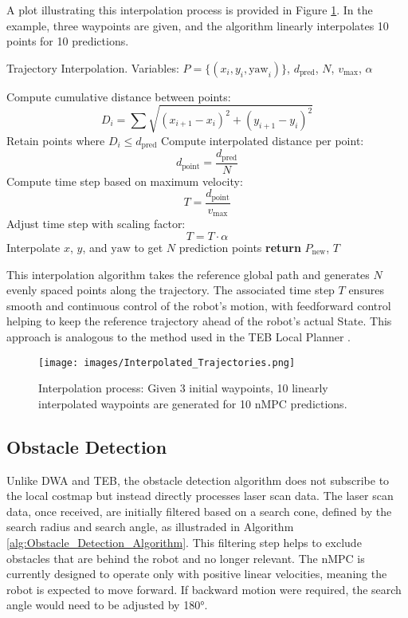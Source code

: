 \documentclass[conference]{IEEEtran}
\begin{document}
A plot illustrating this interpolation process is provided in Figure \ref{fig:nMPC_Interpolation_Plot}. In the example, three waypoints are given, and the algorithm linearly interpolates 10 points for 10 predictions.


\begin{algorithm}
\caption{Trajectory Interpolation. Variables: $P = \{(x_i, y_i, \text{yaw}_i)\}$, $d_{\text{pred}}$, $N$, $v_{\text{max}}$, $\alpha$}
\begin{algorithmic}[1]
\State Compute cumulative distance between points:
\[
D_i = \sum \sqrt{(x_{i+1} - x_i)^2 + (y_{i+1} - y_i)^2}
\]
\State Retain points where $D_i \leq d_{\text{pred}}$
\State Compute interpolated distance per point:
\[
d_{\text{point}} = \frac{d_{\text{pred}}}{N}
\]
\State Compute time step based on maximum velocity:
\[
T = \frac{d_{\text{point}}}{v_{\text{max}}}
\]
\State Adjust time step with scaling factor:
\[
T = T \cdot \alpha
\]
\State Interpolate $x$, $y$, and $\text{yaw}$ to get $N$ prediction points
\State \textbf{return} $P_{\text{new}}$, $T$
\end{algorithmic}
\end{algorithm}


This interpolation algorithm takes the reference global path and generates \( N \) evenly spaced points along the trajectory. The associated time step \( T \) ensures smooth and continuous control of the robot’s motion, with feedforward control helping to keep the reference trajectory ahead of the robot’s actual State. This approach is analogous to the method used in the TEB Local Planner \cite{ROSMANN2017142}.

\begin{figure}[!h]
    \centering
    \texttt{[image: images/Interpolated\_Trajectories.png]}
    \caption{Interpolation process: Given 3 initial waypoints, 10 linearly interpolated waypoints are generated for 10 nMPC predictions.}
    \label{fig:nMPC_Interpolation_Plot}
\end{figure}


\subsection{Obstacle Detection}

Unlike DWA and TEB, the obstacle detection algorithm does not subscribe to the local costmap but instead directly processes laser scan data. The laser scan data, once received, are initially filtered based on a search cone, defined by the search radius and search angle, as illustraded in Algorithm \ref{alg:Obstacle_Detection_Algorithm}. This filtering step helps to exclude obstacles that are behind the robot and no longer relevant. The nMPC is currently designed to operate only with positive linear velocities, meaning the robot is expected to move forward. If backward motion were required, the search angle would need to be adjusted by 180°.
\end{document}
